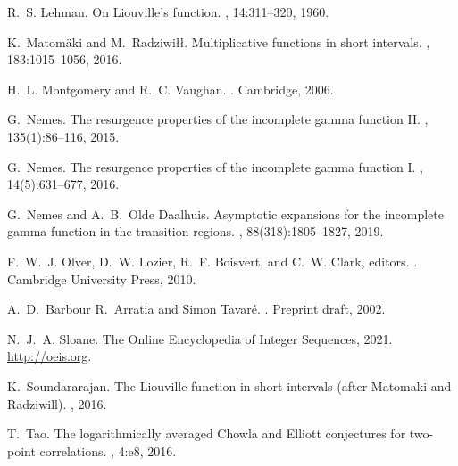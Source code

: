 \documentclass[11pt,reqno,a4letter]{article}
\numberwithin{equation}{section}
\numberwithin{figure}{section}
\numberwithin{table}{section}
\theoremstyle{plain}
\numberwithin{theorem}{section}
\theoremstyle{definition}
\begin{document}
\begin{thebibliography}{10}
R.~S. Lehman.
\newblock On {L}iouville's function.
, 14:311--320, 1960.

K.~Matom{\"{a}}ki and M.~Radziwi{\l\l}.
\newblock Multiplicative functions in short intervals.
, 183:1015--1056, 2016.

H.~L. Montgomery and R.~C. Vaughan.
.
\newblock Cambridge, 2006.

G.~Nemes.
\newblock The resurgence properties of the incomplete gamma function {II}.
, 135(1):86--116, 2015.

G.~Nemes.
\newblock The resurgence properties of the incomplete gamma function {I}.
, 14(5):631--677, 2016.

G.~Nemes and A.~B.~Olde Daalhuis.
\newblock Asymptotic expansions for the incomplete gamma function in the
  transition regions.
, 88(318):1805--1827, 2019.

F.~W.~J. Olver, D.~W. Lozier, R.~F. Boisvert, and C.~W. Clark, editors.
.
\newblock Cambridge University Press, 2010.

A.~D.~Barbour R.~Arratia and Simon Tavar{\'{e}}.
.
\newblock Preprint draft, 2002.

N.~J.~A. Sloane.
\newblock The {O}nline {E}ncyclopedia of {I}nteger {S}equences, 2021.
\newblock \url{http://oeis.org}.

K.~Soundararajan.
\newblock The {L}iouville function in short intervals (after {M}atomaki and
  {R}adziwill).
, 2016.

T.~Tao.
\newblock The logarithmically averaged {C}howla and {E}lliott conjectures for
  two-point correlations.
, 4:e8, 2016.

\end{thebibliography}

\newpage

\appendix
{}
\setcounter{section}{0} 
\renewcommand{\thesection}{\Alph{section}} 
\end{document}
